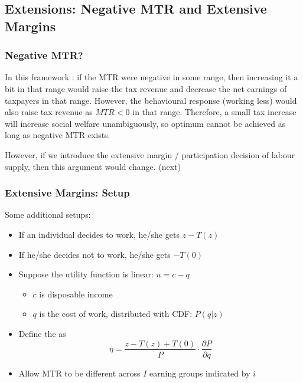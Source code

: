     \subsection{Extensions: Negative MTR and Extensive Margins}

        \subsubsection{Negative MTR?}

            In this framework : if the MTR were negative in some range, then increasing it a bit in that range would raise the tax revenue and decrease the net earnings of taxpayers in that range. However, the behavioural response (working less) would also raise tax revenue as $MTR<0$ in that range. Therefore, a small tax increase will increase social welfare unambiguously, so optimum cannot be achieved as long as negative MTR exists.

            However, if we introduce the extensive margin / participation decision of labour supply, then this argument would change. (next)

        \subsubsection{Extensive Margins: Setup}

            Some additional setups:
            \begin{itemize}
                \item If an individual decides to work, he/she gets $z-T(z)$
                \item If he/she decides not to work, he/she gets $-T(0)$
                \item Suppose the utility function is linear: $u=c-q$
                \begin{itemize}
                    \item $c$ is disposable income
                    \item $q$ is the cost of work, distributed with CDF: $P(q|z)$
                \end{itemize}
                \item Define the  as $$\eta = \frac{z-T(z)+T(0)}{P} \cdot \frac{\partial P}{\partial q}$$
                \item Allow MTR to be different across $I$ earning groups indicated by $i$
            \end{itemize}

